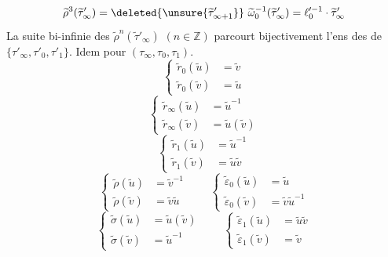 \[
\widetilde\rho^3(\widetilde\tau'_\infty)=\deleted{\unsure{\widetilde\tau'_{\infty+1}}}\ \widetilde\omega_0^{-1}(\widetilde\tau'_\infty)=\ell_0'^{-1}\cdot\widetilde\tau'_\infty
\]
La suite bi-infinie des $\widetilde\rho^n(\widetilde\tau'_\infty)$ $(n\in\mathbb Z)$ parcourt bijectivement l'ens des  de $\{\tau'_\infty,\tau'_0,\tau'_1\}$.
Idem pour $(\tau_\infty,\tau_0,\tau_1)$.
\[
\left\{\begin{aligned}
\widetilde r_0(\widetilde u)&=\widetilde v\\
\widetilde r_0(\widetilde v)&=\widetilde u
\end{aligned}\right.
\]
\[
\left\{\begin{aligned}
\widetilde r_\infty(\widetilde u)&=\widetilde u^{-1}\\
\widetilde r_\infty(\widetilde v)&=\widetilde u(\widetilde v)
\end{aligned}\right.
\]
\[
\left\{\begin{aligned}
\widetilde r_1(\widetilde u)&=\widetilde u^{-1}\\
\widetilde r_1(\widetilde v)&=\widetilde u\widetilde v
\end{aligned}\right.
\]
\[
\left\{\begin{aligned}
\widetilde\rho(\widetilde u)&=\widetilde v^{-1}\\
\widetilde\rho(\widetilde v)&=\widetilde v\widetilde u
\end{aligned}\right.
\qquad
\left\{\begin{aligned}
\widetilde\varepsilon_0(\widetilde u)&=\widetilde u\\
\widetilde\varepsilon_0(\widetilde v)&=\widetilde v\widetilde u^{-1}
\end{aligned}\right.
\]
\[
\left\{\begin{aligned}
\widetilde\sigma(\widetilde u)&=\widetilde u(\widetilde v)\\
\widetilde\sigma(\widetilde v)&=\widetilde u^{-1}
\end{aligned}\right.
\qquad
\left\{\begin{aligned}
\widetilde\varepsilon_1(\widetilde u)&=\widetilde u\widetilde v\\
\widetilde\varepsilon_1(\widetilde v)&=\widetilde v
\end{aligned}\right.
\]

